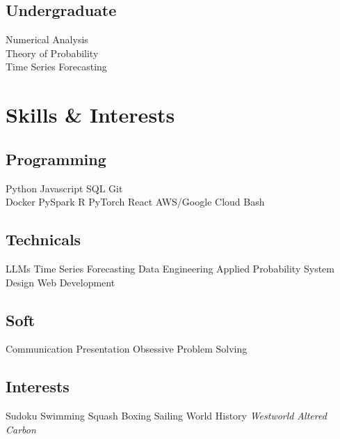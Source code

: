\documentclass[]{deedy-resume-openfont}
\begin{document}
\begin{minipage}[t]{0.28\textwidth}
\sectionsep

\subsection{Undergraduate}
Numerical Analysis \\
Theory of Probability \\
Time Series Forecasting \\
\sectionsep


\section{Skills \& Interests}
\subsection{Programming}
Python \textbullet{} Javascript \textbullet{} SQL \textbullet{} Git \\ 
Docker \textbullet{} PySpark \textbullet{} R \textbullet{}
PyTorch \textbullet{} React \textbullet{} AWS/Google Cloud \textbullet{} Bash
\sectionsep 

\subsection{Technicals}
LLMs \textbullet{} Time Series Forecasting \textbullet{} Data Engineering \textbullet{} Applied Probability \textbullet{} System Design  \textbullet{} Web Development
\sectionsep

\subsection{Soft}
Communication \textbullet{} Presentation \textbullet{} Obsessive Problem Solving
\sectionsep

\subsection{Interests}
Sudoku \textbullet{} Swimming \textbullet{} Squash \textbullet{} Boxing \textbullet{} Sailing \textbullet{} World History \textbullet{} \textit{Westworld} \textbullet{} \textit{Altered Carbon}
\sectionsep



\end{minipage}
\end{document}
